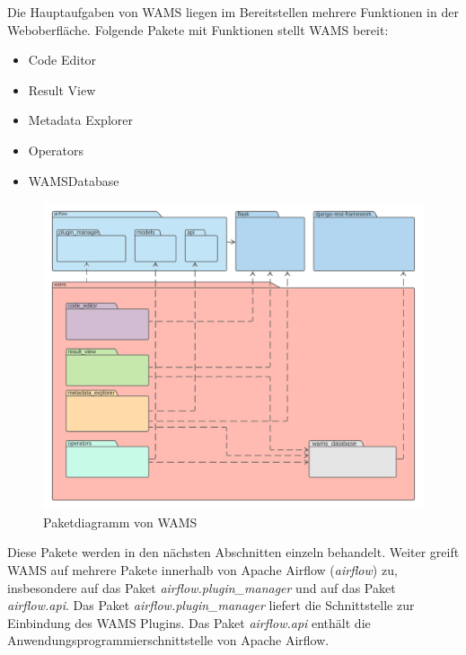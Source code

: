 Die Hauptaufgaben von WAMS liegen im Bereitstellen mehrere Funktionen in der Weboberfläche.
Folgende Pakete mit Funktionen stellt WAMS bereit:
\begin{itemize}
    \item Code Editor
    \item Result View
    \item Metadata Explorer
    \item Operators
    \item WAMSDatabase
\end{itemize}

\begin{figure}[h]
    \centering
    \includegraphics[width=\textwidth]{Diagramme/Paket.png}
    \caption{Paketdiagramm von WAMS}
    \label{fig:Paket}
\end{figure}

Diese Pakete werden in den nächsten Abschnitten einzeln behandelt.
Weiter greift WAMS auf mehrere Pakete innerhalb von Apache Airflow (\textit{airflow}) zu, insbesondere auf das Paket \textit{airflow.plugin\_manager} und auf das Paket \textit{airflow.api}. Das Paket \textit{airflow.plugin\_manager} liefert die Schnittstelle zur Einbindung des WAMS Plugins.
Das Paket \textit{airflow.api} enthält die Anwendungsprogrammierschnittstelle von Apache Airflow.

